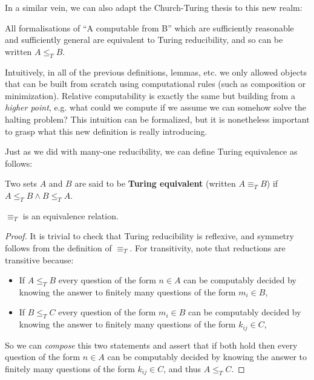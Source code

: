\documentclass[../main.tex]{memoir}
\begin{document}
In a similar vein, we can also adapt the Church-Turing thesis to this new realm:

\begin{definition}
  All formalisations of ``A computable from B'' which are sufficiently reasonable and sufficiently general are equivalent to Turing reducibility, and so can be written $A \le_T B$.
\end{definition}

Intuitively, in all of the previous definitions, lemmas, etc. we only allowed objects that can be built from scratch using computational rules (such as composition or minimization). Relative computability is exactly the same but building from a \textit{higher point}, e.g. what could we compute if we assume we can somehow solve the halting problem? This intuition can be formalized, but it is nonetheless important to grasp what this new definition is really introducing.

Just as we did with many-one reducibility, we can define Turing equivalence as follows:

\begin{definition}
  Two sets $A$ and $B$ are said to be \textbf{Turing equivalent} (written $A \equiv_T B$) if $A \le_T B \land B \le_T A$.
\end{definition}

\begin{lemma}
  \label{lemma:turing-equivalence}
  $\equiv_T$ is an equivalence relation.
\end{lemma}
\begin{proof}
  It is trivial to check that Turing reducibility is reflexive, and symmetry follows from the definition of $\equiv_T$. For transitivity, note that reductions are transitive because:
  \begin{itemize}
  \item If $A \le_T B$ every question of the form $n \in A$ can be computably decided by knowing the answer to finitely many questions of the form $m_i \in B$,
  \item If $B \le_T C$ every question of the form $m_i \in B$ can be computably decided by knowing the answer to finitely many questions of the form $k_{ij} \in C$,
  \end{itemize}
  So we can \textit{compose} this two statements and assert that if both hold then every question of the form $n \in A$ can be computably decided by knowing the answer to finitely many questions of the form $k_{ij} \in C$, and thus $A \le_T C$.
\end{proof}
\end{document}
